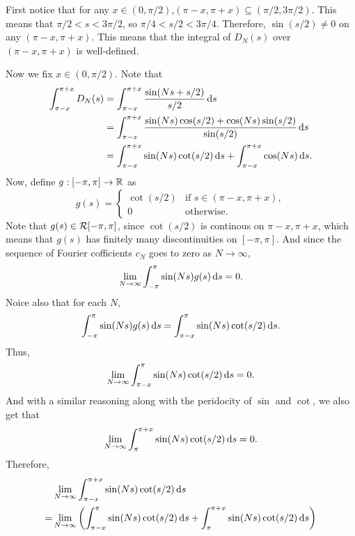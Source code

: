 \documentclass[12pt]{article}
\begin{document}
\begin{fproof}[4(a)]
 First notice that for any \(x \in (0, \pi/2)\),\((\pi - x, \pi + x) \subseteq (\pi/2, 3\pi/2)\).
 This means that \(\pi/2 < s < 3\pi/2 \), so \(\pi/4 < s/2 < 3\pi/4\).
 Therefore, \(\sin(s/2) \neq 0\) on any \((\pi - x, \pi + x)\).
 This means that the integral of \(D_N(s)\) over \((\pi - x, \pi + x)\) is well-defined.

 Now we fix \(x \in (0, \pi/2)\).
 Note that
 \begin{align*}
   \int_{\pi - x}^{\pi+x} D_N(s) 
   &= \int_{\pi - x}^{\pi+x} \frac{\sin(Ns + s/2)}{s/2} \mathop{}\!\mathrm{d} s\\
   &=\int_{\pi - x}^{\pi+x}\frac{\sin(Ns)\cos(s/2)+\cos(Ns)\sin(s/2)}{\sin(s/2)} \mathop{}\!\mathrm{d} s\\
   &=\int_{\pi - x}^{\pi+x} \sin(Ns) \cot(s/2) \mathop{}\!\mathrm{d} s + \int_{\pi - x}^{\pi+x} \cos(Ns) \mathop{}\!\mathrm{d} s.
 \end{align*}
 Now, define \(g: [-\pi, \pi] \to \mathbb {R}\) as
 \[
 g(s) = \begin{cases}
   \cot(s/2) & \text{if } s \in (\pi-x, \pi+x),\\
   0 & \text{otherwise}.
 \end{cases}
 \]
 Note that \(g(s)\in \mathcal{R}[-\pi, \pi]\), since \(\cot(s/2)\) is continous on \(\pi-x, \pi+x\), which means that \(g(s)\) has finitely many discontinuities on \([-\pi, \pi]\).
 And since the sequence of Fourier cofficients \(c_N\) goes to zero as \(N \to \infty\),
 \begin{align*}
   \lim_{N\to \infty} \int_{-\pi}^{\pi} \sin(Ns) g(s) \mathop{}\!\mathrm{d} s = 0.
 \end{align*}
 Noice also that for each \(N\),
 \begin{align*}
   \int_{-\pi}^{\pi} \sin(Ns) g(s) \mathop{}\!\mathrm{d} s = \int_{\pi-x}^{\pi} \sin(Ns) \cot(s/2) \mathop{}\!\mathrm{d} s.
 \end{align*}
 Thus, 
 \begin{align*}
   \lim_{N\to \infty} \int_{\pi-x}^{\pi} \sin(Ns) \cot(s/2) \mathop{}\!\mathrm{d} s = 0.
 \end{align*}
 And with a similar reasoning along with the peridocity of \(\sin\) and \(\cot\), we also get that
 \begin{align*}
   \lim_{N\to \infty} \int_{\pi}^{\pi+x} \sin(Ns) \cot(s/2) \mathop{}\!\mathrm{d} s = 0.
 \end{align*}
 Therefore, 
 \begin{align*}
   &\lim_{N \to \infty} \int_{\pi-x}^{\pi+x} \sin(Ns) \cot(s/2) \ds \\
   =& \lim_{N \to \infty} \pare{\int_{\pi-x}^{\pi} \sin(Ns) \cot(s/2) \ds + \int_{\pi}^{\pi+x} \sin(Ns) \cot(s/2) \ds}\\

\end{align*}
\end{fproof}
\end{document}
